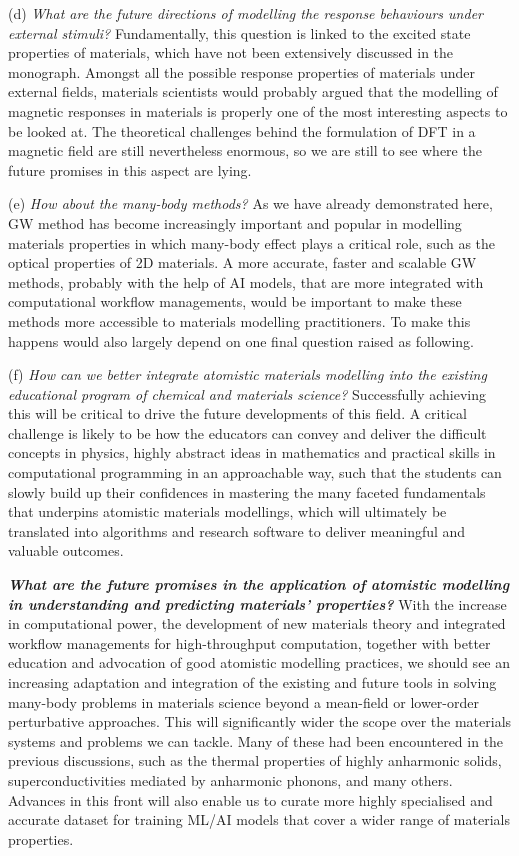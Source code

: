 (d) \emph{What are the future directions of modelling the response behaviours under external stimuli?} Fundamentally, this question is linked to the excited state properties of materials, which have not been extensively discussed in the monograph. Amongst all the possible response properties of materials under external fields, materials scientists would probably argued that the modelling of magnetic responses in materials is properly one of the most interesting aspects to be looked at. The theoretical challenges behind the formulation of DFT in a magnetic field are still nevertheless enormous,\cite{DFT_exchange} so we are still to see where the future promises in this aspect are lying.

(e) \emph{How about the many-body methods?} As we have already demonstrated here, GW method has become increasingly important and popular in modelling materials properties in which many-body effect plays a critical role, such as the optical properties of 2D materials. A more accurate, faster and scalable GW methods, probably with the help of AI models,\cite{hou2024unsupervised,hou2025data} that are more integrated with computational workflow managements,\cite{ganose2025atomate2} would be important to make these methods more accessible to materials modelling practitioners. To make this happens would also largely depend on one final question raised as following.

(f) \emph{How can we better integrate atomistic  materials  modelling into the existing educational program of chemical and materials science?}  Successfully achieving this will be critical to drive the future developments of this field. A critical challenge is likely to be how the educators can convey and deliver the difficult concepts in physics, highly abstract ideas in mathematics and practical skills in computational programming in an approachable way, such that the students can slowly build up their confidences in mastering the many faceted fundamentals that underpins atomistic materials modellings, which will ultimately be translated into algorithms and research software to deliver meaningful and valuable outcomes. 

\textbf{\emph{What are the future promises in the application of atomistic modelling in understanding and predicting materials' properties?}} With the increase in computational power, the development of new materials theory and integrated workflow managements for high-throughput computation, together with better education and advocation of good atomistic modelling practices, we should see an increasing adaptation and integration of the existing and future tools in solving many-body problems in materials science beyond a mean-field or lower-order perturbative approaches. This will significantly wider the scope over the materials systems and problems we can tackle. Many of these had been encountered in the previous discussions, such as the thermal properties of highly anharmonic solids, superconductivities mediated by anharmonic phonons, and many others. Advances in this front will also enable us to curate more highly specialised and accurate dataset for training ML/AI models that cover a wider range of materials properties.



